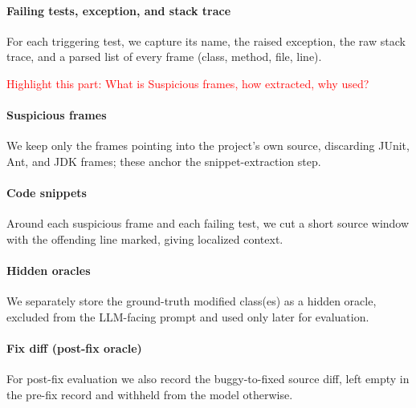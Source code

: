 
\paragraph{Failing tests, exception, and stack trace}
For each triggering test, we capture its name, the raised exception, the raw
stack trace, and a parsed list of every frame (class, method, file, line).

\textcolor{red}{Highlight this part: What is Suspicious frames, how extracted, why used?}
\paragraph{Suspicious frames}
We keep only the frames pointing into the project's own source, discarding
JUnit, Ant, and JDK frames; these anchor the snippet-extraction step.

\paragraph{Code snippets}
Around each suspicious frame and each failing test, we cut a short source
window with the offending line marked, giving localized context.

\paragraph{Hidden oracles}
We separately store the ground-truth modified class(es) as a hidden oracle,
excluded from the LLM-facing prompt and used only later for evaluation.

\paragraph{Fix diff (post-fix oracle)}
For post-fix evaluation we also record the buggy-to-fixed source diff, left
empty in the pre-fix record and withheld from the model otherwise.



